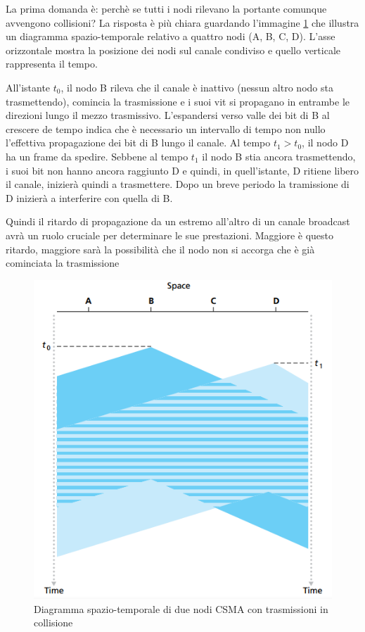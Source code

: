 \documentclass[11pt,a4paper]{article}
\begin{document}
{La prima domanda è: perchè se tutti i nodi rilevano la portante comunque avvengono collisioni? La risposta è più chiara guardando l'immagine \ref{fig: 080} che illustra un diagramma spazio-temporale relativo a quattro nodi (A, B, C, D). L'asse orizzontale mostra la posizione dei nodi sul canale condiviso e quello verticale rappresenta il tempo.

All'istante $t_{0}$, il nodo B rileva che il canale è inattivo (nessun altro nodo sta trasmettendo), comincia la trasmissione e i suoi vit si propagano in entrambe le direzioni lungo il mezzo trasmissivo. L'espandersi verso valle dei bit di B al crescere de tempo indica che è necessario un intervallo di tempo non nullo l'effettiva propagazione dei bit di B lungo il canale. Al tempo $t_{1} > t_{0}$, il nodo D ha un frame da spedire. Sebbene al tempo $t_{1}$ il nodo B stia ancora trasmettendo, i suoi bit non hanno ancora raggiunto D e quindi, in quell'istante, D ritiene libero il canale, inizierà quindi a trasmettere. Dopo un breve periodo la tramissione di D inizierà a interferire con quella di B.

Quindi il ritardo di propagazione da un estremo all'altro di un canale broadcast avrà un ruolo cruciale per determinare le sue prestazioni. Maggiore è questo ritardo, maggiore sarà la possibilità che il nodo non si accorga che è già cominciata la trasmissione
\begin{figure}
	\begin{center}
		\includegraphics[scale=0.6]{img/080.png}
		\caption{Diagramma spazio-temporale di due nodi CSMA con trasmissioni in collisione}
		\label{fig: 080}
	\end{center}
\end{figure}

}
\end{document}

